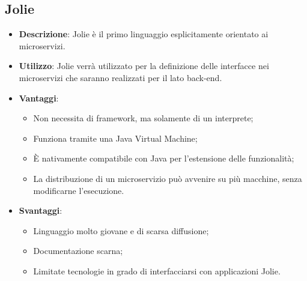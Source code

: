 \subsection{Jolie}
\begin{itemize}
	\item \textbf{Descrizione}: Jolie è il primo linguaggio esplicitamente orientato ai microservizi. 
	\item \textbf{Utilizzo}: Jolie verrà utilizzato per la definizione delle interfacce nei microservizi che saranno realizzati per il lato back-end.
	\item \textbf{Vantaggi}:
	\begin{itemize}
		\item Non necessita di framework, ma solamente di un interprete;
		\item Funziona tramite una Java Virtual Machine;
		\item \MakeUppercase{è} nativamente compatibile con Java per l'estensione delle funzionalità;
		\item La distribuzione di un microservizio può avvenire su più macchine, senza modificarne l'esecuzione.
	\end{itemize}
	\item \textbf{Svantaggi}:
	\begin{itemize}
		\item Linguaggio molto giovane e di scarsa diffusione;
		\item Documentazione scarna;
		\item Limitate tecnologie in grado di interfacciarsi con applicazioni Jolie.
	\end{itemize}
\end{itemize}

